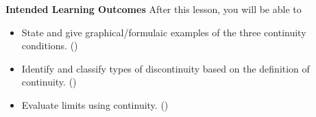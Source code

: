 \documentclass[10pt]{article}
\begin{document}
\thispagestyle{firstpage}
\pagestyle{otherpages}

\textbf{Intended Learning Outcomes}
After this lesson, you will be able to 

\begin{itemize}
    \item State and give graphical/formulaic examples of the three continuity conditions. ()
    \item Identify and classify types of discontinuity based on the definition of continuity. ()
    \item Evaluate limits using continuity. ()
\end{itemize}

\vspace{-0.5cm}

\hrulefill

\vspace{0.3cm}
\end{document}

